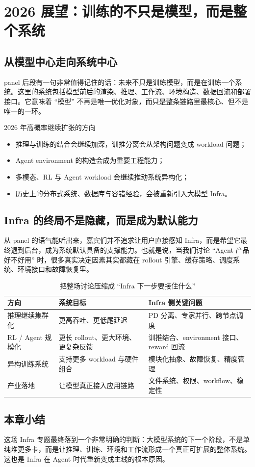 \section{2026 展望：训练的不只是模型，而是整个系统}

\subsection{从模型中心走向系统中心}
panel 后段有一句非常值得记住的话：未来不只是训练模型，而是在训练一个系统。这里的系统包括模型前后的渲染、推理、工作流、环境构造、数据回流和部署接口。它意味着 ``模型'' 不再是唯一优化对象，而只是整条链路里最核心、但不是唯一的一环。

\begin{importantbox}{2026 年高概率继续扩张的方向}
\begin{itemize}
  \item 推理与训练的结合会继续加深，训推分离会从架构问题变成 workload 问题；
  \item Agent environment 的构造会成为重要工程能力；
  \item 多模态、RL 与 Agent workload 会继续推动系统异构化；
  \item 历史上的分布式系统、数据库与容错经验，会被重新引入大模型 Infra。
\end{itemize}
\end{importantbox}

\subsection{Infra 的终局不是隐藏，而是成为默认能力}
从 panel 的语气能听出来，嘉宾们并不追求让用户直接感知 Infra，而是希望它最终退到后台，成为系统默认具备的支撑能力。也就是说，当我们讨论 ``Agent 产品好不好用'' 时，很多真实决定因素其实都藏在 rollout 引擎、缓存策略、调度系统、环境接口和故障恢复里。

\begin{table}[H]
\centering
\begin{tabular}{p{2.8cm}p{4.2cm}p{4.4cm}}
\toprule
\textbf{方向} & \textbf{系统目标} & \textbf{Infra 侧关键问题} \\
\midrule
推理继续集群化 & 更高吞吐、更低尾延迟 & PD 分离、专家并行、跨节点调度 \\
RL / Agent 规模化 & 更长 rollout、更大环境、更复杂反馈 & 训推结合、environment 接口、reward 回流 \\
异构训练系统 & 支持更多 workload 与硬件组合 & 模块化抽象、故障恢复、精度管理 \\
产业落地 & 让模型真正接入应用链路 & 文件系统、权限、workflow、稳定性 \\
\bottomrule
\end{tabular}
\caption{把整场讨论压缩成 ``Infra 下一步要接住什么''}
\end{table}

\subsection{本章小结}
这场 Infra 专题最终落到一个非常明确的判断：大模型系统的下一个阶段，不是单纯堆更多卡，而是让推理、训练、环境和工作流形成一个真正可扩展的整体系统。这也是 Infra 在 Agent 时代重新变成主线的根本原因。

